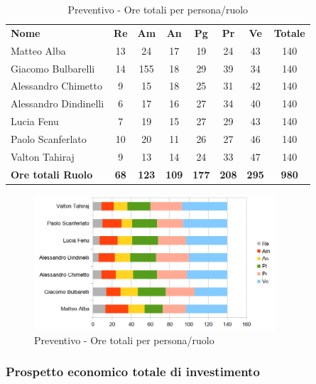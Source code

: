 		\begin{table} [h!]
			\begin{center}
				\begin{tabular} { m{3.5cm} c c c c c c c }
					\rowcolor{lightgray}
					\textbf{Nome} & \textbf{Re} & \textbf{Am} & \textbf{An} & \textbf{Pg} & \textbf{Pr} & \textbf{Ve} & \textbf{Totale} \\
					Matteo Alba & 13& 24& 17 & 19 & 24 & 43 & 140 \\
					Giacomo Bulbarelli & 14 & 155 & 18 & 29 & 39 & 34 & 140 \\
					Alessandro Chimetto & 9 & 15 & 18 & 25 & 31 & 42 & 140 \\
					Alessandro Dindinelli & 6 & 17 & 16 & 27 & 34 & 40 & 140 \\
					Lucia Fenu & 7 & 19 & 15 & 27 & 29 & 43 & 140 \\
					Paolo Scanferlato & 10 & 20 & 11 & 26 & 27 & 46 & 140 \\
					Valton Tahiraj & 9& 13 & 14 & 24 & 33 & 47 & 140 \\
					\textbf{Ore totali Ruolo} & \textbf{68} & \textbf{123} & \textbf{109} & \textbf{177} & \textbf{208}& \textbf{295} & \textbf{980}
				\end{tabular}
				\caption{Preventivo - Ore totali per persona/ruolo}
			\end{center}
		\end{table}
	
		\begin{figure} [h!]
			\centering
			\includegraphics[width=0.8\textwidth]{res/img/grafici/preventivo-barre-finale.png}
			\caption{Preventivo - Ore totali per persona/ruolo} 
		\end{figure}
	
	\newpage
	
	\subsubsection{Prospetto economico totale di investimento}
	
